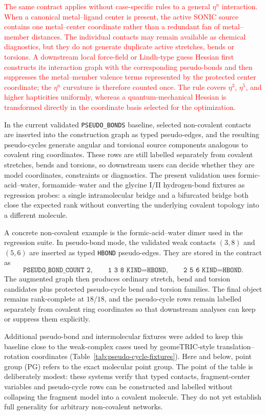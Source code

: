 \documentclass[journal=jctcce,manuscript=article,layout=traditional]{achemso}
\theoremstyle{definition}
\begin{document}
\textcolor{red}{The same contract applies without case-specific rules to a
general \(\eta^n\) interaction.  When a canonical metal--ligand center is
present, the active SONIC source contains one metal--center coordinate rather
than a redundant fan of metal--member distances.  The individual contacts may
remain available as chemical diagnostics, but they do not generate duplicate
active stretches, bends or torsions.  A downstream local force-field or
Lindh-type guess Hessian first constructs its interaction graph with the
corresponding pseudo-bonds and then suppresses the metal--member valence terms
represented by the protected center coordinate; the \(\eta^n\) curvature is
therefore counted once.  The rule covers \(\eta^3\), \(\eta^5\), and higher
hapticities uniformly, whereas a quantum-mechanical Hessian is transformed
directly in the coordinate basis selected for the optimization.}

In the current validated \texttt{PSEUDO\_BONDS} baseline, selected
non-covalent contacts are inserted into the construction graph as typed
pseudo-edges, and the resulting pseudo-cycles generate angular and torsional
source components analogous to covalent ring coordinates.  These rows are still
labelled separately from covalent stretches, bends and torsions, so downstream
users can decide whether they are model coordinates, constraints or
diagnostics.  The present validation uses formic-acid--water, formamide--water
and the glycine I/II hydrogen-bond fixtures as regression probes: a single
intramolecular bridge and a bifurcated bridge both close the expected rank
without converting the underlying covalent topology into a different molecule.

A concrete non-covalent example is the formic-acid--water dimer used in the
regression suite.  In pseudo-bond mode, the validated weak contacts
\((3,8)\) and \((5,6)\) are inserted as typed \texttt{HBOND} pseudo-edges.
They are stored in the contract as
\[
  \texttt{PSEUDO\_BOND\_COUNT 2}, \qquad
  \texttt{1 3 8 KIND=HBOND}, \qquad
  \texttt{2 5 6 KIND=HBOND}.
\]
The augmented graph then produces ordinary stretch, bend and torsion candidates
plus protected pseudo-cycle bend and torsion families.  The final object
remains rank-complete at \(18/18\), and the pseudo-cycle rows remain labelled
separately from covalent ring coordinates so that downstream analyses can keep
or suppress them explicitly.

Additional pseudo-bond and intermolecular fixtures were added to keep this
baseline close to the weak-complex cases used by geomeTRIC-style
translation--rotation coordinates (Table~\ref{tab:pseudo-cycle-fixtures}).
Here and below, point group (PG) refers to the exact molecular point group.
The point of the table is deliberately modest: these systems verify that typed
contacts, fragment-center variables and pseudo-cycle rows can be constructed
and labelled without collapsing the fragment model into a covalent molecule.
They do not yet establish full generality for arbitrary non-covalent networks.
\end{document}
